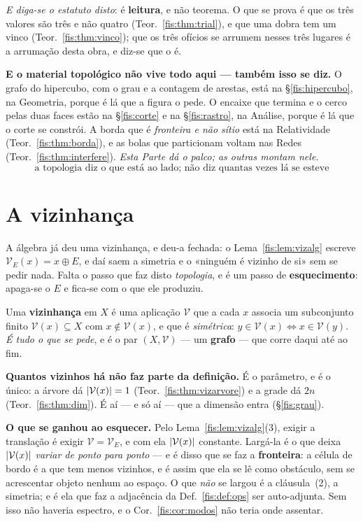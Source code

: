 \documentclass[livro.tex]{subfiles}
\begin{document}
\medskip\noindent\emph{E diga-se o estatuto disto}: é \textbf{leitura}, e não
teorema. O que se prova é que os três valores são três e não quatro
(Teor.~\ref{fis:thm:trial}), e que uma dobra tem um vinco
(Teor.~\ref{fis:thm:vinco}); que os três ofícios se arrumem nesses três lugares
é a arrumação desta obra, e diz-se que o é.

\medskip\noindent\textbf{E o material topológico não vive todo aqui --- também
isso se diz.} O grafo do hipercubo, com o grau e a contagem de arestas, está na
§\ref{fis:hipercubo}, na Geometria, porque é lá que a figura o pede. O encaixe
que termina e o cerco pelas duas faces estão na §\ref{fis:corte} e na
§\ref{fis:rastro}, na Análise, porque é lá que o corte se constrói. A borda que
é \emph{fronteira e não sítio} está na Relatividade
(Teor.~\ref{fis:thm:borda}), e as bolas que particionam voltam nas Redes
(Teor.~\ref{fis:thm:interfere}). \emph{Esta Parte dá o palco; as outras montam
nele.}
\[
\boxed{\;\text{a topologia diz o que está ao lado; não diz quantas vezes lá se esteve}\;}
\]

\section{A vizinhança}\label{fis:viz}

\noindent A álgebra já deu uma vizinhança, e deu-a fechada: o
Lema~\ref{fis:lem:vizalg} escreve $\mathcal{V}_E(x)=x\oplus E$, e daí saem a
simetria e o «ninguém é vizinho de si» sem se pedir nada. Falta o passo que faz
disto \emph{topologia}, e é um passo de \textbf{esquecimento}: apaga-se o $E$ e
fica-se com o que ele produziu.

\begin{definicao}[a vizinhança]\label{fis:def:viztopo}
Uma \textbf{vizinhança} em $X$ é uma aplicação $\mathcal{V}$ que a cada $x$
associa um subconjunto finito $\mathcal{V}(x)\subseteq X$ com
$x\notin\mathcal{V}(x)$, e que é \emph{simétrica}:
$y\in\mathcal{V}(x)\iff x\in\mathcal{V}(y)$. \emph{É tudo o que se pede}, e é o
par $(X,\mathcal{V})$ --- um \textbf{grafo} --- que corre daqui até ao fim.

\medskip\noindent\textbf{Quantos vizinhos há não faz parte da definição.} É o
parâmetro, e é o único: a árvore dá $\lvert \mathcal{V}(x)\rvert=1$
(Teor.~\ref{fis:thm:vizarvore}) e a grade dá $2n$ (Teor.~\ref{fis:thm:dim}). É aí
--- e só aí --- que a dimensão entra (§\ref{fis:grau}).
\end{definicao}

\medskip\noindent\textbf{O que se ganhou ao esquecer.} Pelo
Lema~\ref{fis:lem:vizalg}(3), exigir a translação é exigir
$\mathcal{V}=\mathcal{V}_E$, e com ela $\lvert \mathcal{V}(x)\rvert$ constante. Largá-la
é o que deixa $\lvert \mathcal{V}(x)\rvert$ \emph{variar de ponto para ponto} --- e é
disso que se faz a \textbf{fronteira}: a célula de bordo é a que tem menos
vizinhos, e é assim que ela se lê como obstáculo, sem se acrescentar objeto
nenhum ao espaço. O que \emph{não} se largou é a cláusula~(2), a simetria; e é
ela que faz a adjacência da Def.~\ref{fis:def:ops} ser auto-adjunta. Sem isso não
haveria espectro, e o Cor.~\ref{fis:cor:modos} não teria onde assentar.
\end{document}
